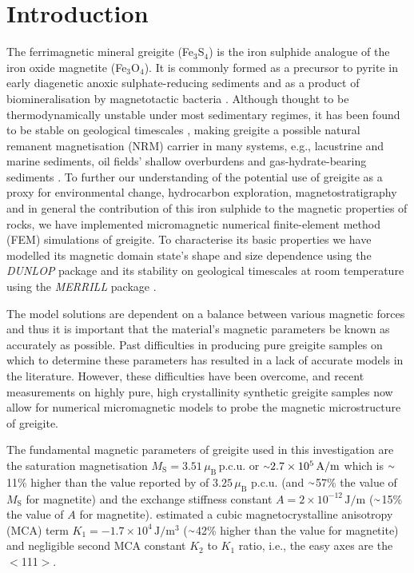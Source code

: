 \documentclass[review,authoryear]{elsarticle}
\newcommand{\roughly}{{\raise.17ex\hbox{$\scriptstyle\sim$}}}
\begin{document}
\section{Introduction}

The ferrimagnetic mineral greigite (Fe$_3$S$_4$) is the iron sulphide analogue of the iron oxide magnetite (Fe$_3$O$_4$). It is commonly formed as a precursor to pyrite in early diagenetic anoxic sulphate-reducing sediments \citep{Berner1984, Hunger2007} and as a product of biomineralisation by magnetotactic bacteria \citep{Mann1990}. Although thought to be thermodynamically unstable under most sedimentary regimes, it has been found to be stable on geological timescales \citep{Roberts2011}, making greigite a possible natural remanent magnetisation (NRM) carrier in many systems, e.g., lacustrine \citep{Babinszki2007, Ron2007} and marine \citep{Roberts1993, Roberts2005, Rowan2006, Rowan2009} sediments, oil fields' shallow overburdens \citep{Abubakar2015, Donovan1984, Reynolds1993} and gas-hydrate-bearing sediments \citep{Larrasoana2007}. To further our understanding of the potential use of greigite as a proxy for environmental change, hydrocarbon exploration, magnetostratigraphy and in general the contribution of this iron sulphide to the magnetic properties of rocks, we have implemented micromagnetic numerical finite-element method (FEM) simulations of greigite. To characterise its basic properties we have modelled its magnetic domain state's shape and size dependence using the \textit{DUNLOP} package \citep{Nagy2016} and its stability on geological timescales at room temperature using the \textit{MERRILL} package \citep{Nagy2017}.\par

The model solutions are dependent on a balance between various magnetic forces and thus it is important that the material's magnetic parameters be known as accurately as possible. Past difficulties in producing pure greigite samples on which to determine these parameters has resulted in a lack of accurate models in the literature. However, these difficulties have been overcome, and recent measurements on highly pure, high crystallinity synthetic greigite samples \citep{Chang2008,Chang2009,Guowei2014,Winklhofer2014} now allow for numerical micromagnetic models to probe the magnetic microstructure of greigite.\par

The fundamental magnetic parameters of greigite used in this investigation are the saturation magnetisation $M_\text{S}=3.51\,\mu_\text{B}\,\text{p.c.u.}$ \citep{Guowei2014} or $\roughly 2.7 \times 10^5\,\text{A/m}$  which is $\roughly$11\% higher than the value reported by \citet{Chang2009} of $3.25\,\mu_\text{B}$ p.c.u. (and $\roughly$57\% the value of  $M_\text{S}$ for magnetite) and the exchange stiffness constant $A=2\times10^{-12}\,\text{J}/\text{m}$ \citep{Chang2008} ($\roughly$15\% the value of $A$ for magnetite). \citet{Winklhofer2014} estimated a cubic magnetocrystalline anisotropy (MCA) term $K_1=-1.7\times10^4\,\text{J}/\text{m}^3$ ($\roughly$42\% higher than the value for magnetite) and negligible second MCA constant $K_2$ to $K_1$ ratio, i.e., the easy axes are the $<$111$>$.\par
\end{document}
